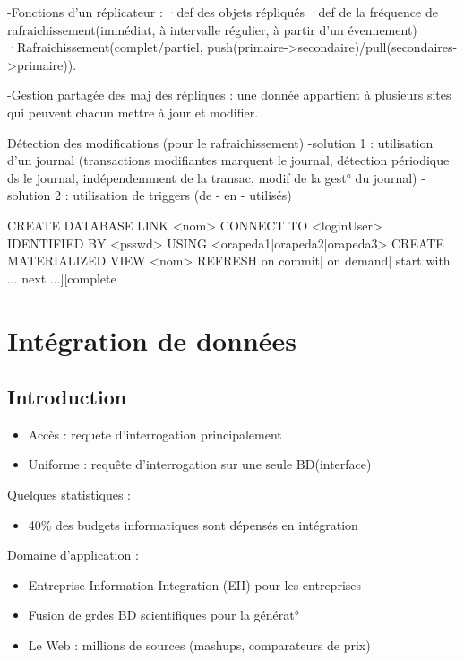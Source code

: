 	-Fonctions d'un réplicateur :
		·def des objets répliqués
		·def de la fréquence de rafraichissement(immédiat, à intervalle régulier, à partir d'un évennement)
		·Rafraichissement(complet/partiel, push(primaire->secondaire)/pull(secondaires->primaire)).

	-Gestion partagée des maj des répliques : une donnée appartient à plusieurs sites qui peuvent chacun mettre à jour et modifier.

	Détection des modifications (pour le rafraichissement)
		-solution 1 : utilisation d'un journal (transactions modifiantes marquent le journal, détection périodique ds le journal, indépendemment de la transac, modif de la gest° du journal)
		-solution 2 : utilisation de triggers (de - en - utilisés)


CREATE DATABASE LINK <nom> CONNECT TO <loginUser> IDENTIFIED BY <psswd> USING <orapeda1|orapeda2|orapeda3>
CREATE MATERIALIZED VIEW <nom> REFRESH {on commit| on demand| start with ... next ...][complete}
%
%
%

\section{Intégration de données}


\subsection{Introduction}

\begin{itemize}
\item Accès : requete d'interrogation principalement
\item Uniforme : requête d'interrogation sur une seule BD(interface)
\end{itemize}


Quelques statistiques :
\begin{itemize}
\item 40\% des budgets informatiques sont dépensés en intégration
\end{itemize}

Domaine d'application :
\begin{itemize}
\item Entreprise Information Integration (EII) pour les entreprises
\item Fusion de grdes BD scientifiques pour la générat°
\item Le Web : millions de sources (mashups, comparateurs de prix)
\end{itemize}

